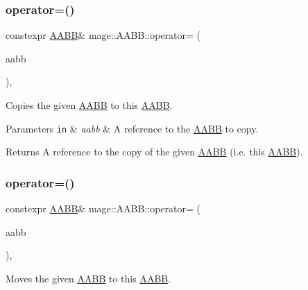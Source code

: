 \subsubsection{\texorpdfstring{operator=()}{operator=()}\hspace{0.1cm}{\footnotesize\ttfamily [1/2]}}
{\footnotesize\ttfamily constexpr \hyperlink{structmage_1_1_a_a_b_b}{A\+A\+BB}\& mage\+::\+A\+A\+B\+B\+::operator= (\begin{DoxyParamCaption}\item[{const \hyperlink{structmage_1_1_a_a_b_b}{A\+A\+BB} \&}]{aabb }\end{DoxyParamCaption})\hspace{0.3cm}{\ttfamily [default]}, {\ttfamily [noexcept]}}

Copies the given \hyperlink{structmage_1_1_a_a_b_b}{A\+A\+BB} to this \hyperlink{structmage_1_1_a_a_b_b}{A\+A\+BB}.


\begin{DoxyParams}[1]{Parameters}
\mbox{\tt in}  & {\em aabb} & A reference to the \hyperlink{structmage_1_1_a_a_b_b}{A\+A\+BB} to copy. \\
\hline
\end{DoxyParams}
\begin{DoxyReturn}{Returns}
A reference to the copy of the given \hyperlink{structmage_1_1_a_a_b_b}{A\+A\+BB} (i.\+e. this \hyperlink{structmage_1_1_a_a_b_b}{A\+A\+BB}). 
\end{DoxyReturn}
\hypertarget{structmage_1_1_a_a_b_b_ad3922871f317937fb328cf0fdfe8b644}{}\label{structmage_1_1_a_a_b_b_ad3922871f317937fb328cf0fdfe8b644} 
\subsubsection{\texorpdfstring{operator=()}{operator=()}\hspace{0.1cm}{\footnotesize\ttfamily [2/2]}}
{\footnotesize\ttfamily constexpr \hyperlink{structmage_1_1_a_a_b_b}{A\+A\+BB}\& mage\+::\+A\+A\+B\+B\+::operator= (\begin{DoxyParamCaption}\item[{\hyperlink{structmage_1_1_a_a_b_b}{A\+A\+BB} \&\&}]{aabb }\end{DoxyParamCaption})\hspace{0.3cm}{\ttfamily [default]}, {\ttfamily [noexcept]}}

Moves the given \hyperlink{structmage_1_1_a_a_b_b}{A\+A\+BB} to this \hyperlink{structmage_1_1_a_a_b_b}{A\+A\+BB}.


